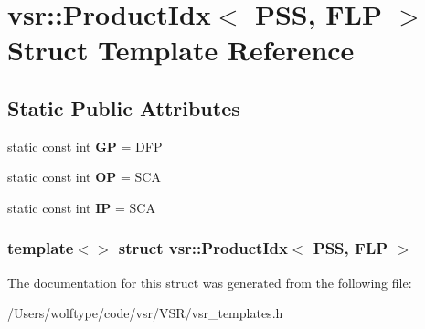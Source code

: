 \hypertarget{structvsr_1_1_product_idx_3_01_p_s_s_00_01_f_l_p_01_4}{\section{vsr\-:\-:Product\-Idx$<$ P\-S\-S, F\-L\-P $>$ Struct Template Reference}
\label{structvsr_1_1_product_idx_3_01_p_s_s_00_01_f_l_p_01_4}
}
\subsection*{Static Public Attributes}
\begin{DoxyCompactItemize}
\item 
\hypertarget{structvsr_1_1_product_idx_3_01_p_s_s_00_01_f_l_p_01_4_ac530341c88df00e9dea6582dfd7808eb}{static const int {\bfseries G\-P} = D\-F\-P}\label{structvsr_1_1_product_idx_3_01_p_s_s_00_01_f_l_p_01_4_ac530341c88df00e9dea6582dfd7808eb}

\item 
\hypertarget{structvsr_1_1_product_idx_3_01_p_s_s_00_01_f_l_p_01_4_a4ba273b0bd6bc674fc9296ebe7a76422}{static const int {\bfseries O\-P} = S\-C\-A}\label{structvsr_1_1_product_idx_3_01_p_s_s_00_01_f_l_p_01_4_a4ba273b0bd6bc674fc9296ebe7a76422}

\item 
\hypertarget{structvsr_1_1_product_idx_3_01_p_s_s_00_01_f_l_p_01_4_a8c0cf1abbf198bbcb99a40d4fa858a59}{static const int {\bfseries I\-P} = S\-C\-A}\label{structvsr_1_1_product_idx_3_01_p_s_s_00_01_f_l_p_01_4_a8c0cf1abbf198bbcb99a40d4fa858a59}

\end{DoxyCompactItemize}
\subsubsection*{template$<$$>$ struct vsr\-::\-Product\-Idx$<$ P\-S\-S, F\-L\-P $>$}



The documentation for this struct was generated from the following file\-:\begin{DoxyCompactItemize}
\item 
/\-Users/wolftype/code/vsr/\-V\-S\-R/vsr\-\_\-templates.\-h\end{DoxyCompactItemize}
